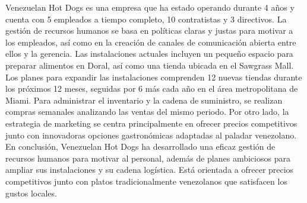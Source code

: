 Venezuelan Hot Dogs es una empresa que ha estado operando durante 4 años y cuenta con 5 empleados a tiempo completo, 10 contratistas y 3 directivos. La gestión de recursos humanos se basa en políticas claras y justas para motivar a los empleados, así como en la creación de canales de comunicación abierta entre ellos y la gerencia. Las instalaciones actuales incluyen un pequeño espacio para preparar alimentos en Doral, así como una tienda ubicada en el Sawgrass Mall. Los planes para expandir las instalaciones comprenden 12 nuevas tiendas durante los próximos 12 meses, seguidas por 6 más cada año en el área metropolitana de Miami. Para administrar el inventario y la cadena de suministro, se realizan compras semanales analizando las ventas del mismo periodo. Por otro lado, la estrategia de marketing se centra principalmente en ofrecer precios competitivos junto con innovadoras opciones gastronómicas adaptadas al paladar venezolano.
En conclusión, Venezuelan Hot Dogs ha desarrollado una eficaz gestión de recursos humanos para motivar al personal, además de planes ambiciosos para ampliar sus instalaciones y su cadena logística. Está orientada a ofrecer precios competitivos junto con platos tradicionalmente venezolanos que satisfacen los gustos locales.
